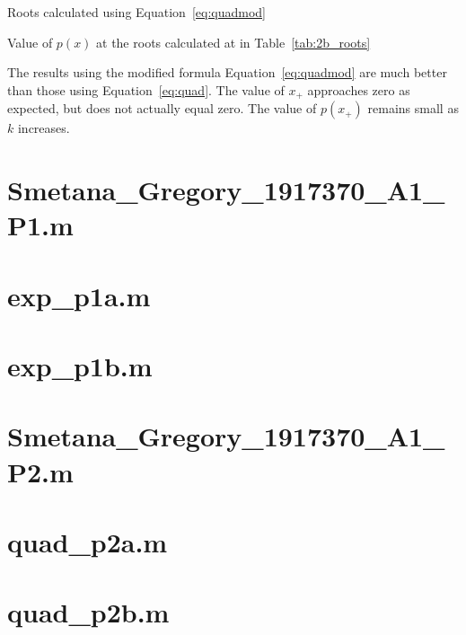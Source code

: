 \documentclass[11pt]{article} %
\begin{document}
\begin{table}[h!]
\centering

\caption{Roots calculated using Equation~\ref{eq:quadmod}}
\label{tab:2b_roots}
\end{table}


\begin{table}[h!]
\centering

\caption{Value of $p(x)$ at the roots calculated at in Table~\ref{tab:2b_roots}}
\label{tab:2b_value}
\end{table}

The results using the modified formula Equation~\ref{eq:quadmod} are much better than those using Equation~\ref{eq:quad}. The value of $x_+$ approaches zero as expected, but does not actually equal zero. The value of $p(x_+)$ remains small as $k$ increases.
\clearpage
\appendix
\section{Smetana\_Gregory\_1917370\_A1\_P1.m}


\section{exp\_p1a.m}


\section{exp\_p1b.m}


\section{Smetana\_Gregory\_1917370\_A1\_P2.m}


\section{quad\_p2a.m}


\section{quad\_p2b.m}

\end{document}
